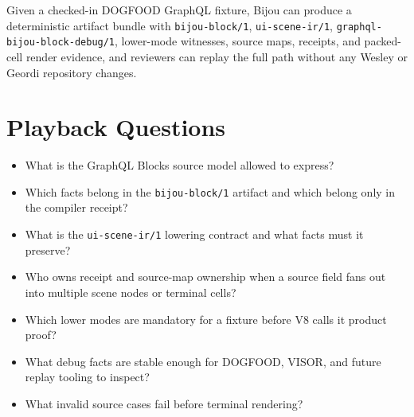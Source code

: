 Given a checked-in DOGFOOD GraphQL fixture, Bijou can produce a deterministic artifact bundle with \texttt{b\allowbreak{}i\allowbreak{}j\allowbreak{}o\allowbreak{}u\allowbreak{}-\allowbreak{}b\allowbreak{}l\allowbreak{}o\allowbreak{}c\allowbreak{}k\allowbreak{}/\allowbreak{}1}, \texttt{u\allowbreak{}i\allowbreak{}-\allowbreak{}s\allowbreak{}c\allowbreak{}e\allowbreak{}n\allowbreak{}e\allowbreak{}-\allowbreak{}i\allowbreak{}r\allowbreak{}/\allowbreak{}1}, \texttt{g\allowbreak{}r\allowbreak{}a\allowbreak{}p\allowbreak{}h\allowbreak{}q\allowbreak{}l\allowbreak{}-\allowbreak{}b\allowbreak{}i\allowbreak{}j\allowbreak{}o\allowbreak{}u\allowbreak{}-\allowbreak{}b\allowbreak{}l\allowbreak{}o\allowbreak{}c\allowbreak{}k\allowbreak{}-\allowbreak{}d\allowbreak{}e\allowbreak{}b\allowbreak{}u\allowbreak{}g\allowbreak{}/\allowbreak{}1}, lower-mode witnesses, source maps, receipts, and packed-cell render evidence, and reviewers can replay the full path without any Wesley or Geordi repository changes.

\section{Playback Questions}\label{record-144-playback-questions}

\begin{itemize}
\tightlist
\item
  What is the GraphQL Blocks source model allowed to express?
\item
  Which facts belong in the \texttt{b\allowbreak{}i\allowbreak{}j\allowbreak{}o\allowbreak{}u\allowbreak{}-\allowbreak{}b\allowbreak{}l\allowbreak{}o\allowbreak{}c\allowbreak{}k\allowbreak{}/\allowbreak{}1} artifact and which belong only in the compiler receipt?
\item
  What is the \texttt{u\allowbreak{}i\allowbreak{}-\allowbreak{}s\allowbreak{}c\allowbreak{}e\allowbreak{}n\allowbreak{}e\allowbreak{}-\allowbreak{}i\allowbreak{}r\allowbreak{}/\allowbreak{}1} lowering contract and what facts must it preserve?
\item
  Who owns receipt and source-map ownership when a source field fans out into multiple scene nodes or terminal cells?
\item
  Which lower modes are mandatory for a fixture before V8 calls it product proof?
\item
  What debug facts are stable enough for DOGFOOD, VISOR, and future replay tooling to inspect?
\item
  What invalid source cases fail before terminal rendering?
\end{itemize}

